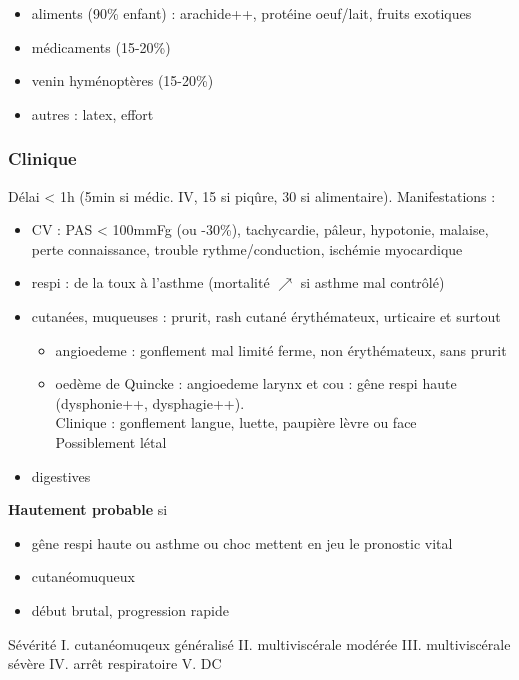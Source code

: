 \documentclass[11pt]{article}
\begin{document}
\begin{itemize}
\item aliments (90\% enfant) : arachide++, protéine oeuf/lait, fruits exotiques
\item médicaments (15-20\%)
\item venin hyménoptères (15-20\%)
\item autres : latex, effort
\end{itemize}


\subsubsection{Clinique}
\label{sec:org6fe3d1b}
Délai < 1h (5min si médic. IV, 15 si piqûre, 30 si alimentaire).
Manifestations :

\begin{itemize}
\item CV : PAS < 100mmFg (ou -30\%), tachycardie, pâleur, hypotonie, malaise,
perte connaissance, trouble rythme/conduction, ischémie myocardique
\item respi : de la toux à l'asthme (mortalité \(\nearrow\) si asthme mal
contrôlé)
\item cutanées, muqueuses : prurit, rash cutané érythémateux, urticaire et
surtout 

\begin{itemize}
\item angioedeme : gonflement mal limité ferme, non érythémateux, sans
prurit
\item oedème de Quincke : angioedeme larynx et cou : gêne respi haute
(dysphonie++, dysphagie++). \\
Clinique : gonflement langue, luette, paupière lèvre ou face\\
Possiblement létal
\end{itemize}

\item digestives
\end{itemize}

\textbf{Hautement probable}  si 

\begin{itemize}
\item gêne respi haute ou asthme ou choc
mettent en jeu le pronostic vital
\item cutanéomuqueux
\item début brutal, progression rapide
\end{itemize}

Sévérité
I. cutanéomuqeux généralisé
II. multiviscérale modérée
III. multiviscérale sévère
IV. arrêt respiratoire
V. DC
\end{document}
